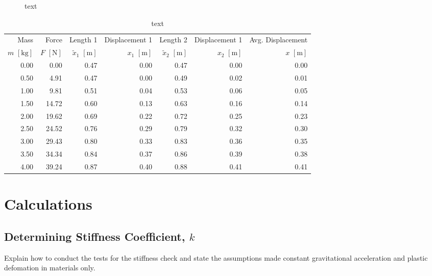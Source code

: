 \documentclass[a4paper]{article}
\begin{document}
\begin{figure}[h]
	\centering
	\caption{text}
\end{figure}

\begin{table}[h]
	\centering
	\caption{text}\small
	\begin{tabular}{rrrrrrr}
		\toprule
		Mass & Force & Length 1 & Displacement  1 & Length 2 & Displacement  1 & Avg. Displacement \\
		$m$ $[\si{\kilogram}]$ & $F$ $[\si{\newton}]$ & $\tilde{x}_1$ $[\si{\meter}]$ & $x_1$ $[\si{\meter}]$ & $\tilde{x}_2$ $[\si{\meter}]$ & $x_2$ $[\si{\meter}]$ & $x$ $[\si{\meter}]$ \\
		\midrule
		0.00 &  0.00 & 0.47 & 0.00 & 0.47 & 0.00 & 0.00\\
		0.50 &  4.91 & 0.47 & 0.00 & 0.49 & 0.02 & 0.01\\
		1.00 &  9.81 & 0.51 & 0.04 & 0.53 & 0.06 & 0.05\\
		1.50 & 14.72 & 0.60 & 0.13 & 0.63 & 0.16 & 0.14\\
		2.00 & 19.62 & 0.69 & 0.22 & 0.72 & 0.25 & 0.23\\
		2.50 & 24.52 & 0.76 & 0.29 & 0.79 & 0.32 & 0.30\\
		3.00 & 29.43 & 0.80 & 0.33 & 0.83 & 0.36 & 0.35\\
		3.50 & 34.34 & 0.84 & 0.37 & 0.86 & 0.39 & 0.38\\
		4.00 & 39.24 & 0.87 & 0.40 & 0.88 & 0.41 & 0.41\\
		\bottomrule
	\end{tabular}
\end{table}

\section{Calculations}
\subsection{Determining Stiffness Coefficient, $k$}
Explain how to conduct the tests for the stiffness check and state the assumptions made constant gravitational acceleration and plastic defomation in materials only.
\end{document}
